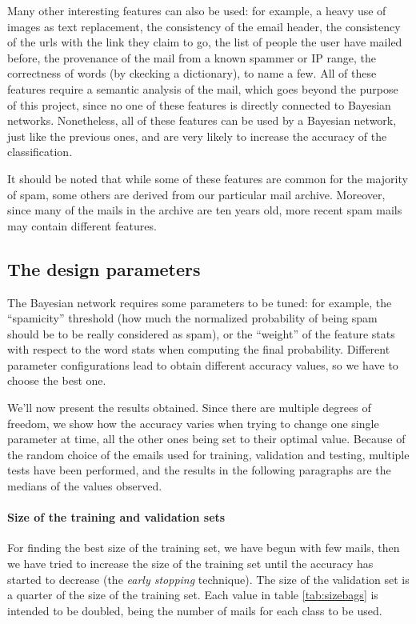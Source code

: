 Many other interesting features can also be used: for example, a heavy use of images as text replacement, the consistency of the email header, the consistency of the urls with the link they claim to go, the list of people the user have mailed before, the provenance of the mail from a known spammer or IP range, the correctness of words (by ckecking a dictionary), to name a few. All of these features require a semantic analysis of the mail, which goes beyond the purpose of this project, since no one of these features is directly connected to Bayesian networks. Nonetheless, all of these features can be used by a Bayesian network, just like the previous ones, and are very likely to increase the accuracy of the classification.

It should be noted that while some of these features are common for the majority of spam, some others are derived from our particular mail archive. Moreover, since many of the mails in the archive are ten years old, more recent spam mails may contain different features.%

\subsection{The design parameters}
The Bayesian network requires some parameters to be tuned: for example, the ``spamicity'' threshold (how much the normalized probability of being spam should be to be really considered as spam), or the ``weight'' of the feature stats with respect to the word stats when computing the final probability. Different parameter configurations lead to obtain different accuracy values, so we have to choose the best one.

We'll now present the results obtained. Since there are multiple degrees of freedom, we show how the accuracy varies when trying to change one single parameter at time, all the other ones being set to their optimal value. Because of the random choice of the emails used for training, validation and testing, multiple tests have been performed, and the results in the following paragraphs are the medians of the values observed.

\paragraph{Size of the training and validation sets}
For finding the best size of the training set, we have begun with few mails, then we have tried to increase the size of the training set until the accuracy has started to decrease (the \textit{early stopping} technique). The size of the validation set is a quarter of the size of the training set. Each value in table \ref{tab:sizebags} is intended to be doubled, being the number of mails for each class to be used.

